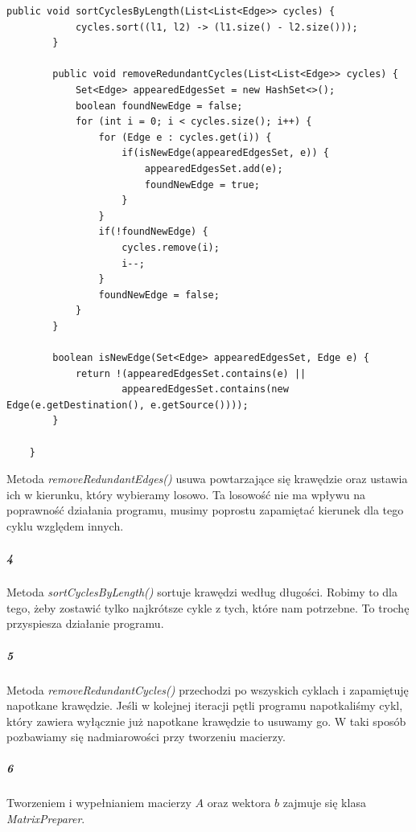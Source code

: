\documentclass[12pt,a4paper]{article}
\begin{document}
\begin{Verbatim}[fontsize=\small]
        public void sortCyclesByLength(List<List<Edge>> cycles) {
            cycles.sort((l1, l2) -> (l1.size() - l2.size()));
        }

        public void removeRedundantCycles(List<List<Edge>> cycles) {
            Set<Edge> appearedEdgesSet = new HashSet<>();
            boolean foundNewEdge = false;
            for (int i = 0; i < cycles.size(); i++) {
                for (Edge e : cycles.get(i)) {
                    if(isNewEdge(appearedEdgesSet, e)) {
                        appearedEdgesSet.add(e);
                        foundNewEdge = true;
                    }
                }
                if(!foundNewEdge) {
                    cycles.remove(i);
                    i--;
                }
                foundNewEdge = false;
            }
        }

        boolean isNewEdge(Set<Edge> appearedEdgesSet, Edge e) {
            return !(appearedEdgesSet.contains(e) ||
                    appearedEdgesSet.contains(new Edge(e.getDestination(), e.getSource())));
        }

    }
\end{Verbatim}
Metoda \emph{removeRedundantEdges()} usuwa powtarzające się krawędzie oraz ustawia ich
w kierunku, który wybieramy losowo. Ta losowość nie ma wpływu na poprawność
działania programu, musimy poprostu zapamiętać kierunek dla tego cyklu względem
innych.
\subparagraph{4} Metoda \emph{sortCyclesByLength()} sortuje krawędzi według długości. Robimy to
dla tego, żeby zostawić tylko najkrótsze cykle z tych, które nam potrzebne. To
trochę przyspiesza działanie programu.
\subparagraph{5} Metoda \emph{removeRedundantCycles()} przechodzi po wszyskich cyklach i zapamiętuję
napotkane krawędzie. Jeśli w kolejnej iteracji pętli programu napotkaliśmy cykl,
który zawiera wyłącznie już napotkane krawędzie to usuwamy go. W taki sposób
pozbawiamy się nadmiarowości przy tworzeniu macierzy.
\subparagraph{6} Tworzeniem i wypełnianiem macierzy $A$ oraz wektora $b$ zajmuje
się klasa \emph{MatrixPreparer}.
\end{document}
